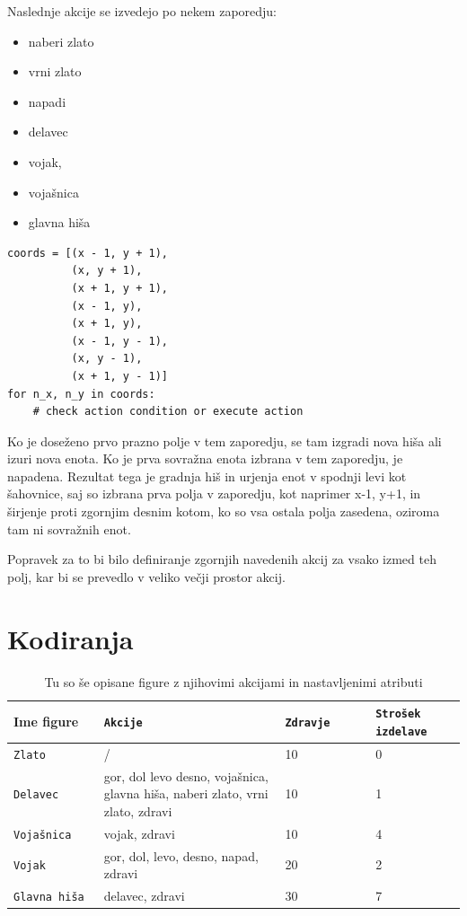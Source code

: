 \documentclass[a4paper, 12pt]{book}
\begin{document}
Naslednje akcije se izvedejo po nekem zaporedju:
\begin{itemize}
	\item naberi zlato
	\item vrni zlato
	\item napadi
	\item delavec
	\item vojak, 
	\item vojašnica
	\item glavna hiša
\end{itemize}
\begin{verbatim}
coords = [(x - 1, y + 1),
          (x, y + 1),
          (x + 1, y + 1),
          (x - 1, y),
          (x + 1, y),
          (x - 1, y - 1),
          (x, y - 1),
          (x + 1, y - 1)]
for n_x, n_y in coords:
    # check action condition or execute action
\end{verbatim}
Ko je doseženo prvo prazno polje v tem zaporedju, se tam izgradi nova hiša ali izuri nova enota.
Ko je prva sovražna enota izbrana v tem zaporedju, je napadena.
Rezultat tega je gradnja hiš in urjenja enot v spodnji levi kot šahovnice, saj so izbrana prva polja v zaporedju, kot naprimer x-1, y+1, in širjenje proti zgornjim desnim kotom, ko so vsa ostala polja zasedena, oziroma tam ni sovražnih enot.

Popravek za to bi bilo definiranje zgornjih navedenih akcij za vsako izmed teh polj, kar bi se prevedlo v veliko večji prostor akcij.

\section{Kodiranja}

\begin{table}

	\begin{center}
		
	\begin{tabular}{p{0.2\linewidth}|p{0.4\linewidth}|p{0.2\linewidth}|p{0.2\linewidth}}
		Ime figure & {\tt Akcije} & {\tt Zdravje} & {\tt Strošek izdelave} \\ \hline
		{\tt Zlato} & / & 10 & 0 \\
		{\tt Delavec}   & gor, dol levo desno, vojašnica, glavna hiša, naberi zlato, vrni zlato, zdravi & 10  & 1 \\
		{\tt Vojašnica}   & vojak, zdravi & 10  & 4 \\
		{\tt Vojak}   & gor, dol, levo, desno, napad, zdravi  & 20 & 2 \\
		{\tt Glavna hiša}   & delavec, zdravi & 30  & 7 \\
	\end{tabular}
	\end{center}
	\caption{Tu so še opisane figure z njihovimi akcijami in nastavljenimi atributi}
	\label{tabelfigures}
\end{table}
\end{document}
